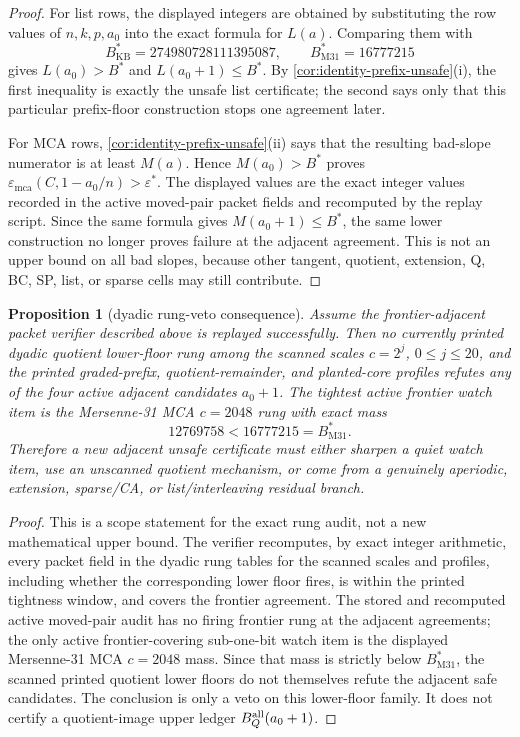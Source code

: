 \documentclass[a4paper,11pt]{amsart}
\newtheorem{proposition}[proposition]{Proposition}
\theoremstyle{remark}
\newcommand{\emca}{\varepsilon_{\mathrm{mca}}}
\begin{document}
\begin{proof}
For list rows, the displayed integers are obtained by substituting the row values of \(n,k,p,a_0\) into the exact formula for \(L(a)\).  Comparing them with
\[
        B^*_{\mathrm{KB}}=274980728111395087,
        \qquad
        B^*_{\mathrm{M31}}=16777215
\]
gives \(L(a_0)>B^*\) and \(L(a_0+1)\le B^*\).  By \cref{cor:identity-prefix-unsafe}(i), the first inequality is exactly the unsafe list certificate; the second says only that this particular prefix-floor construction stops one agreement later.

For MCA rows, \cref{cor:identity-prefix-unsafe}(ii) says that the resulting bad-slope numerator is at least \(M(a)\).  Hence \(M(a_0)>B^*\) proves \(\emca(C,1-a_0/n)>\varepsilon^*\).  The displayed values are the exact integer values recorded in the active moved-pair packet fields and recomputed by the replay script.  Since the same formula gives \(M(a_0+1)\le B^*\), the same lower construction no longer proves failure at the adjacent agreement.  This is not an upper bound on all bad slopes, because other tangent, quotient, extension, Q, BC, SP, list, or sparse cells may still contribute.
\end{proof}

\begin{proposition}[dyadic rung-veto consequence]\label{prop:rung-veto}
Assume the frontier-adjacent packet verifier described above is replayed successfully.  Then no currently printed dyadic quotient lower-floor rung among the scanned scales \(c=2^j\), \(0\le j\le20\), and the printed graded-prefix, quotient-remainder, and planted-core profiles refutes any of the four active adjacent candidates \(a_0+1\).  The tightest active frontier watch item is the Mersenne-31 MCA \(c=2048\) rung with exact mass
\[
        12769758<16777215=B^*_{\mathrm{M31}}.
\]
Therefore a new adjacent unsafe certificate must either sharpen a quiet watch item, use an unscanned quotient mechanism, or come from a genuinely aperiodic, extension, sparse/CA, or list/interleaving residual branch.
\end{proposition}

\begin{proof}
This is a scope statement for the exact rung audit, not a new mathematical upper bound.  The verifier recomputes, by exact integer arithmetic, every packet field in the dyadic rung tables for the scanned scales and profiles, including whether the corresponding lower floor fires, is within the printed tightness window, and covers the frontier agreement.  The stored and recomputed active moved-pair audit has no firing frontier rung at the adjacent agreements; the only active frontier-covering sub-one-bit watch item is the displayed Mersenne-31 MCA \(c=2048\) mass.  Since that mass is strictly below \(B^*_{\mathrm{M31}}\), the scanned printed quotient lower floors do not themselves refute the adjacent safe candidates.  The conclusion is only a veto on this lower-floor family.  It does not certify a quotient-image upper ledger \(B_Q^{\rm all}(a_0+1)\).
\end{proof}
\end{document}
